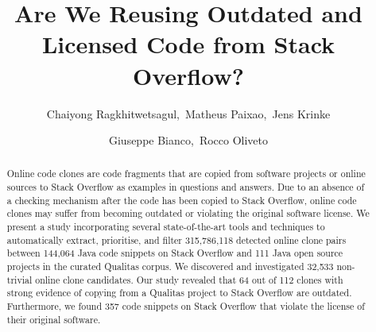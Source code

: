 \documentclass[sigconf,review, anonymous]{acmart}
\begin{document}
	\title{Are We Reusing Outdated and Licensed Code from Stack Overflow?}
	
\author{Chaiyong Ragkhitwetsagul,~Matheus Paixao,~Jens Krinke}

\author{Giuseppe Bianco,~Rocco Oliveto}

\begin{abstract}
  Online code clones are code fragments that are copied from software
  projects or online sources to Stack Overflow as examples in
  questions and answers.
  Due to an absence of a checking mechanism after the code has been
  copied to Stack Overflow, online code clones may suffer from
  becoming outdated or violating the original software license.
  We present a study incorporating several state-of-the-art tools and
  techniques to automatically extract, prioritise, and filter
  315,786,118 detected online clone pairs between 144,064 Java code
  snippets on Stack Overflow and 111 Java open source projects in the
  curated Qualitas corpus. We discovered and investigated 32,533
  non-trivial online clone candidates. Our study revealed that 64 out
  of 112 clones with strong evidence of copying from a Qualitas
  project to Stack Overflow are outdated. Furthermore, we found 357
  code snippets on Stack Overflow that violate the license of their
  original software.
\end{abstract}
\end{document}
